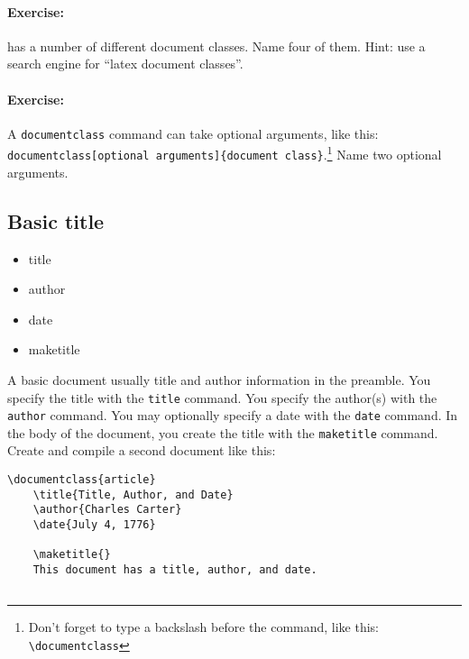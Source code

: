         \paragraph{Exercise:}\Lx{} has a number of different document classes. Name four of them. Hint: use a search engine for ``latex document classes''.

        \paragraph{Exercise:}A \texttt{documentclass} command can take optional arguments, like this: \texttt{documentclass[optional arguments]\{document class\}}.\footnote{Don't forget to type a backslash before the command, like this: \texttt{\textbackslash{}documentclass}} Name two optional arguments.

        \subsection{Basic title}
        \label{Basic-title}
        
        \begin{cmd}
            \begin{itemize}
                \item{title}
                \item{author}
                \item{date}
                \item{maketitle}
            \end{itemize}
        \end{cmd}

        A basic document usually title and author information in the preamble. You specify the title with the \texttt{title} command. You specify the author(s) with the \texttt{author} command. You may optionally specify a date with the \texttt{date} command. In the body of the document, you create the title with the \texttt{maketitle} command. Create and compile a second document like this:        

        \begin{verbatim}
\documentclass{article}
    \title{Title, Author, and Date}
    \author{Charles Carter}
    \date{July 4, 1776}
 
    \maketitle{}
    This document has a title, author, and date.
    
        \end{verbatim}

